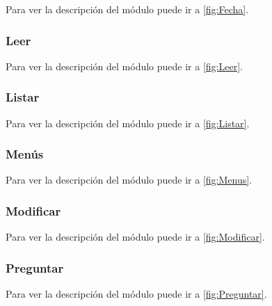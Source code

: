 Para ver la descripción del módulo puede ir a \ref{fig:Fecha}.

\label{fig:FechaCod}


\subsubsection{Leer}

Para ver la descripción del módulo puede ir a \ref{fig:Leer}.

\label{fig:LeerCod}


\subsubsection{Listar}

Para ver la descripción del módulo puede ir a \ref{fig:Listar}.

\label{fig:ListarCod}


\subsubsection{Menús}

Para ver la descripción del módulo puede ir a \ref{fig:Menus}.

\label{fig:MenusCod}


\subsubsection{Modificar}

Para ver la descripción del módulo puede ir a \ref{fig:Modificar}.

\label{fig:ModificarCod}


\subsubsection{Preguntar}

Para ver la descripción del módulo puede ir a \ref{fig:Preguntar}.

\label{fig:PreguntarCod}
